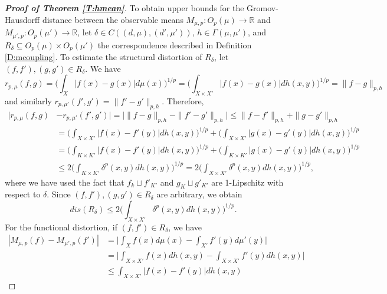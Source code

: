 \documentclass[11pt]{article}
\theoremstyle{definition}
\newcommand{\real}{\ensuremath{\mathbb{R}}}
\newcommand{\obsp}[1]{\ensuremath{O_p(#1)}}
\newcommand{\meanp}[1]{\ensuremath{M_{#1,p}}}
\newcommand{\dlp}[1]{\ensuremath{r_{p,#1}}}
\begin{document}
\begin{proof}[\bf Proof of Theorem \ref{T:hmean}]
To obtain upper bounds for the Gromov-Hausdorff distance between the observable means $\meanp{\mu} \colon \obsp{\mu} \to \real$ and $\meanp{\mu'} \colon \obsp{\mu'} \to \real$, let $\delta \in C((d,\mu), (d',\mu'))$, $h \in \Gamma(\mu,\mu')$, and $R_\delta \subseteq \obsp{\mu}\times \obsp{\mu'}$ the correspondence described in Definition \ref{D:mcoupling}. To estimate the structural distortion of $R_\delta$, let $(f,f'), (g,g') \in R_\delta$. We have
\begin{equation} 
\dlp{\mu} (f,g)= \Big(\int_X |f(x)-g(x)| d\mu (x) \Big)^{1/p}
= \Big(\int_{X \times X'} |f(x)-g(x)| dh (x,y) \Big)^{1/p}
= \|f-g\|_{p,h}
\end{equation}
and similarly $\dlp{\mu'}(f',g') = \|f'-g'\|_{p,h}$. Therefore,
\begin{equation} \label{E:rpdis}
\begin{split}
|\dlp{\mu} (f,g) &- \dlp{\mu'}(f',g')| = \big|\|f-g\|_{p,h} - \|f'-g'\|_{p,h}\big| \leq \|f-f'\|_{p,h} + \|g-g'\|_{p,h} \\
&= \Big(\int_{X \times X'} |f(x)-f'(y)| dh (x,y) \Big)^{1/p} + 
\Big(\int_{X \times X'} |g(x)-g'(y)| dh (x,y) \Big)^{1/p} \\
&= \Big(\int_{K \times K'} |f(x)-f'(y)| dh (x,y) \Big)^{1/p} + 
\Big(\int_{K \times K'} |g(x)-g'(y)| dh (x,y) \Big)^{1/p} \\
&\leq 2 \Big(\int_{K \times K'} \delta^p(x,y) dh (x,y) \Big)^{1/p}
= 2 \Big(\int_{X \times X'} \delta^p(x,y) dh (x,y) \Big)^{1/p},
\end{split}
\end{equation}
where we have used the fact that $f_k\sqcup f'_{K'}$ and $g_K \sqcup g'_{K'}$ are 1-Lipschitz with respect to $\delta$. Since $(f,f'), (g,g') \in R_\delta$ are arbitrary, we obtain
\begin{equation} \label{E:sdist}
dis(R_\delta) \leq 2 \Big(\int_{X \times X'} \delta^p(x,y) dh (x,y) \Big)^{1/p}.
\end{equation}
For the functional distortion, if $(f,f') \in R_\delta$, we have
\begin{equation} \label{E:meandif}
\begin{split}
|\meanp{\mu} (f) - \meanp{\mu'} (f')| &= \Big|\int_X f(x) d\mu(x) - \int_{X'} f'(y) d\mu' (y)\Big| \\
&= \Big|\int_{X\times X'} f(x) dh(x,y) - \int_{X \times X'} f'(y) dh (x,y)\Big|\\
&\leq \int_{X\times X'} |f(x)-f'(y)| dh(x,y)

\end{split}
\end{equation}
\end{proof}
\end{document}
